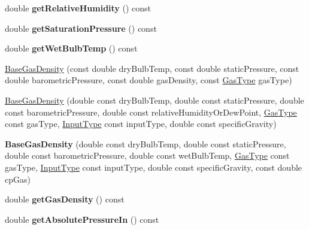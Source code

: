 \begin{DoxyCompactItemize}
double {\bfseries get\+Relative\+Humidity} () const
\item 
\mbox{\label{class_base_gas_density_a2c85831959bdb0b5e6eab370e9408678}} 
double {\bfseries get\+Saturation\+Pressure} () const
\item 
\mbox{\label{class_base_gas_density_a1089d2316a305d825309ed39f3af7454}} 
double {\bfseries get\+Wet\+Bulb\+Temp} () const
\item 
\hyperlink{class_base_gas_density_a84089ddd9d29649d83a7b150b711b989}{Base\+Gas\+Density} (const double dry\+Bulb\+Temp, const double static\+Pressure, const double barometric\+Pressure, const double gas\+Density, const \hyperlink{class_base_gas_density_afb215e48f6193462521b7e8d47306ed3}{Gas\+Type} gas\+Type)
\item 
\hyperlink{class_base_gas_density_a0d53c40eecc4aad87c8fef1cfed1b614}{Base\+Gas\+Density} (double const dry\+Bulb\+Temp, double const static\+Pressure, double const barometric\+Pressure, double const relative\+Humidity\+Or\+Dew\+Point, \hyperlink{class_base_gas_density_afb215e48f6193462521b7e8d47306ed3}{Gas\+Type} const gas\+Type, \hyperlink{class_base_gas_density_a54f846cc4683a49d3904a40fe2986772}{Input\+Type} const input\+Type, double const specific\+Gravity)
\item 
\mbox{\label{class_base_gas_density_a08fc6e441bfec806ea73a9e37be60d92}} 
{\bfseries Base\+Gas\+Density} (double const dry\+Bulb\+Temp, double const static\+Pressure, double const barometric\+Pressure, double const wet\+Bulb\+Temp, \hyperlink{class_base_gas_density_afb215e48f6193462521b7e8d47306ed3}{Gas\+Type} const gas\+Type, \hyperlink{class_base_gas_density_a54f846cc4683a49d3904a40fe2986772}{Input\+Type} const input\+Type, double const specific\+Gravity, const double cp\+Gas)
\item 
\mbox{\label{class_base_gas_density_a1cbf2591aecb384afd5843f0e4a62a4e}} 
double {\bfseries get\+Gas\+Density} () const
\item 
\mbox{\label{class_base_gas_density_a7e99fc6b2f9ecf0399f05fb758499f88}} 
double {\bfseries get\+Absolute\+Pressure\+In} () const
\item 
\mbox{\label{class_base_gas_density_a11a91417432593ac1020265dc4836ee3}} 

\end{DoxyCompactItemize}
